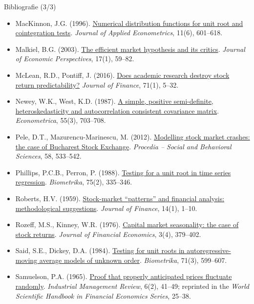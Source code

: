 \begin{frame}{Bibliografie (3/3)}
\itemsize{\tiny}
\begin{itemize}
    \item MacKinnon, J.G. (1996). \href{https://doi.org/10.1002/(SICI)1099-1255(199611)11:6<601::AID-JAE417>3.0.CO;2-T}{Numerical distribution functions for unit root and cointegration tests}. \textit{Journal of Applied Econometrics}, 11(6), 601--618.
    \item Malkiel, B.G. (2003). \href{https://doi.org/10.1257/089533003321164958}{The efficient market hypothesis and its critics}. \textit{Journal of Economic Perspectives}, 17(1), 59--82.
    \item McLean, R.D., Pontiff, J. (2016). \href{https://doi.org/10.1111/jofi.12365}{Does academic research destroy stock return predictability?} \textit{Journal of Finance}, 71(1), 5--32.
    \item Newey, W.K., West, K.D. (1987). \href{https://doi.org/10.2307/1913610}{A simple, positive semi-definite, heteroskedasticity and autocorrelation consistent covariance matrix}. \textit{Econometrica}, 55(3), 703--708.
    \item Pele, D.T., Mazurencu-Marinescu, M. (2012). \href{https://doi.org/10.1016/j.sbspro.2012.09.1030}{Modelling stock market crashes: the case of Bucharest Stock Exchange}. \textit{Procedia -- Social and Behavioral Sciences}, 58, 533--542.
    \item Phillips, P.C.B., Perron, P. (1988). \href{https://doi.org/10.1093/biomet/75.2.335}{Testing for a unit root in time series regression}. \textit{Biometrika}, 75(2), 335--346.
    \item Roberts, H.V. (1959). \href{https://doi.org/10.1111/j.1540-6261.1959.tb00481.x}{Stock-market ``patterns'' and financial analysis: methodological suggestions}. \textit{Journal of Finance}, 14(1), 1--10.
    \item Rozeff, M.S., Kinney, W.R. (1976). \href{https://doi.org/10.1016/0304-405X(76)90028-3}{Capital market seasonality: the case of stock returns}. \textit{Journal of Financial Economics}, 3(4), 379--402.
    \item Said, S.E., Dickey, D.A. (1984). \href{https://doi.org/10.1093/biomet/71.3.599}{Testing for unit roots in autoregressive-moving average models of unknown order}. \textit{Biometrika}, 71(3), 599--607.
    \item Samuelson, P.A. (1965). \href{https://doi.org/10.1142/9789814566926_0002}{Proof that properly anticipated prices fluctuate randomly}. \textit{Industrial Management Review}, 6(2), 41--49; reprinted in the \textit{World Scientific Handbook in Financial Economics Series}, 25--38.

\end{itemize}
\end{frame}
